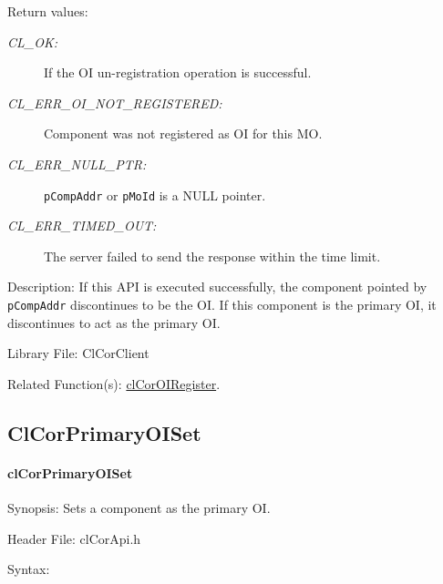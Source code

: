 \begin{flushleft}
\begin{Desc}
\begin{description}
\end{description}
\end{Desc}
\begin{Desc}
\item[Return values:]
\begin{description}

\item[{\em CL\_\-OK:}] If the OI un-registration operation is successful.
 \item[{\em CL\_\-ERR\_\-OI\_\-NOT\_\-REGISTERED:}] Component was not registered as OI for this MO.
 \item[{\em CL\_\-ERR\_\-NULL\_\-PTR:}] {\tt{pCompAddr}} or {\tt{pMoId}} is a NULL pointer.
\item[{\em CL\_\-ERR\_\-TIMED\_\-OUT:}] The server failed to send the response within the time limit.
 
 \end{description}
\end{Desc}
\begin{Desc}
\item[Description:]
If this API is executed successfully, the component pointed by {\tt{pCompAddr}} discontinues to be the OI. If this component is the primary OI, it 
discontinues to act as the primary OI.\end{Desc}
\begin{Desc}
\item[Library File:]Cl\-Cor\-Client\end{Desc}
\begin{Desc}
\item[Related Function(s):]\hyperlink{pagecor135}{clCorOIRegister}.\end{Desc}
\newpage




\subsection{ClCorPrimaryOISet}
\hypertarget{pagecor137}{}\paragraph{cl\-Cor\-Primary\-OI\-Set}\label{pagecor137}
\begin{Desc}
\item[Synopsis:] Sets a component as the primary OI. \end{Desc}
\begin{Desc}
\item[Header File:]clCorApi.h\end{Desc}
\begin{Desc}
\item[Syntax:]


\end{Desc}
\end{flushleft}
